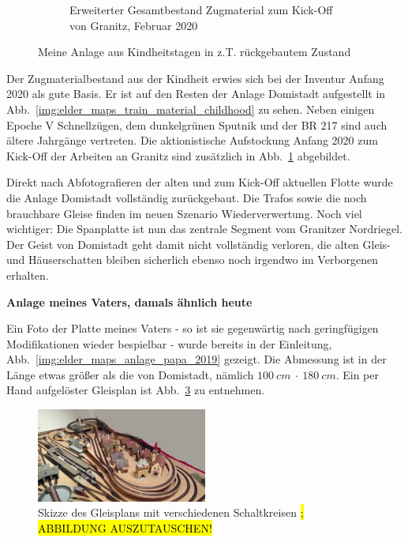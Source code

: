 \begin{figure}[h]
\begin{subfigure}[b]{0.49\textwidth}
   \caption{Erweiterter Gesamtbestand Zugmaterial zum Kick-Off von Granitz, Februar 2020}
    \label{img:elder_maps_train_material_kickoff}
    \end{subfigure}
	\caption{Meine Anlage aus Kindheitstagen in z.T. r\"uckgebautem Zustand}
	\label{img:elder_maps_domistadt}
\end{figure}

Der Zugmaterialbestand aus der Kindheit erwies sich bei der Inventur Anfang 2020 als gute Basis.
Er ist auf den Resten der Anlage Domistadt aufgestellt in Abb.~\ref{img:elder_maps_train_material_childhood} zu sehen.
Neben einigen Epoche V Schnellz\"ugen, dem dunkelgr\"unen Sputnik und der BR 217 sind auch \"altere Jahrg\"ange vertreten.
Die aktionistische Aufstockung Anfang 2020 zum Kick-Off der Arbeiten an Granitz sind zus\"atzlich in Abb.~\ref{img:elder_maps_train_material_kickoff} abgebildet.

Direkt nach Abfotografieren der alten und zum Kick-Off aktuellen Flotte wurde die Anlage Domistadt vollst\"andig zur\"uckgebaut.
Die Trafos sowie die noch brauchbare Gleise finden im neuen Szenario Wiederverwertung.
Noch viel wichtiger: Die Spanplatte ist nun das zentrale Segment vom Granitzer Nordriegel.
Der Geist von Domistadt geht damit nicht vollst\"andig verloren, die alten Gleis- und H\"auserschatten bleiben sicherlich ebenso noch irgendwo im Verborgenen erhalten.


\textbf{Anlage meines Vaters, damals \"ahnlich heute}

Ein Foto der Platte meines Vaters - so ist sie gegenw\"artig nach geringf\"ugigen Modifikationen wieder bespielbar - wurde bereits in der Einleitung, Abb.~\ref{img:elder_maps_anlage_papa_2019} gezeigt.
Die Abmessung ist in der L\"ange etwas gr\"o{\ss}er als die von Domistadt, n\"amlich $100~cm~\cdot~180~cm$.
Ein per Hand aufgel\"oster Gleisplan ist Abb.~\ref{img:elder_maps_anlage_papa_map_domi} zu entnehmen.

\begin{figure}[h]
\centering
  \includegraphics[width=0.5\textwidth]{img/elder_maps/anlage_papa_2019.png}
	\caption{Skizze des Gleisplans mit verschiedenen Schaltkreisen\hl{ ; ABBILDUNG AUSZUTAUSCHEN!}}
	\label{img:elder_maps_anlage_papa_map_domi}
\end{figure}

